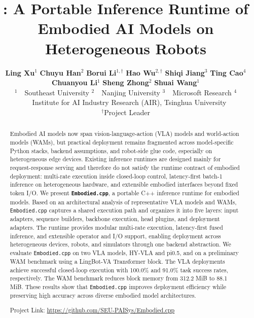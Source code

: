\documentclass[11pt,letterpaper,logo]{seu-paisys}
\title{\system: A Portable Inference Runtime of Embodied AI Models on Heterogeneous Robots}
\author{%
  {\large\textbf{Ling Xu}$^{1}$ \quad \textbf{Chuyu Han}$^{2}$ \quad \textbf{Borui Li}$^{1,\dagger}$ \quad \textbf{Hao Wu}$^{2,\dagger}$ \quad \textbf{Shiqi Jiang}$^{3}$ \quad \textbf{Ting Cao}$^{4}$ \quad \textbf{Chuanyou Li}$^{1}$ \quad \textbf{Sheng Zhong}$^{2}$ \quad \textbf{Shuai Wang}$^{1}$\\}
  \vspace{0.2em}
  {\normalsize 
  $^{1}$\ \seumark\ Southeast University \qquad 
  $^{2}$\ \njumark\ Nanjing University \qquad 
  $^{3}$\ \msmark\ Microsoft Research \qquad \qquad \qquad
  $^{4}$\ \thumark\ Institute for AI Industry Research (AIR), Tsinghua University }

  {\normalsize $^{\dagger}$Project Leader}
}
\newcommand{\system}{\texttt{Embodied.cpp}\xspace}
\begin{document}

\begin{abstract}
\quad Embodied AI models now span vision-language-action (VLA) models and world-action models (WAMs), but practical deployment remains fragmented across model-specific Python stacks, backend assumptions, and robot-side glue code, especially on heterogeneous edge devices. Existing inference runtimes are designed mainly for request-response serving and therefore do not satisfy the runtime contract of embodied deployment: multi-rate execution inside closed-loop control, latency-first batch-1 inference on heterogeneous hardware, and extensible embodied interfaces beyond fixed token I/O. We present \textbf{\system}, a portable C++ inference runtime for embodied models. Based on an architectural analysis of representative VLA models and WAMs, \system captures a shared execution path and organizes it into five layers: input adapters, sequence builders, backbone execution, head plugins, and deployment adapters. The runtime provides modular multi-rate execution, latency-first fused inference, and extensible operator and I/O support, enabling deployment across heterogeneous devices, robots, and simulators through one backend abstraction. We evaluate \system on two VLA models, HY-VLA and pi0.5, and on a preliminary WAM benchmark using a LingBot-VA Transformer block. The VLA deployments achieve successful closed-loop execution with 100.0\% and 91.0\% task success rates, respectively. The WAM benchmark reduces block memory from 312.2 MiB to 88.1 MiB. These results show that \system improves deployment efficiency while preserving high accuracy across diverse embodied model architectures.

\quad Project Link: \href{https://github.com/SEU-PAISys/Embodied.cpp}{https://github.com/SEU-PAISys/Embodied.cpp}
\end{abstract}

\maketitle

%
\end{document}
